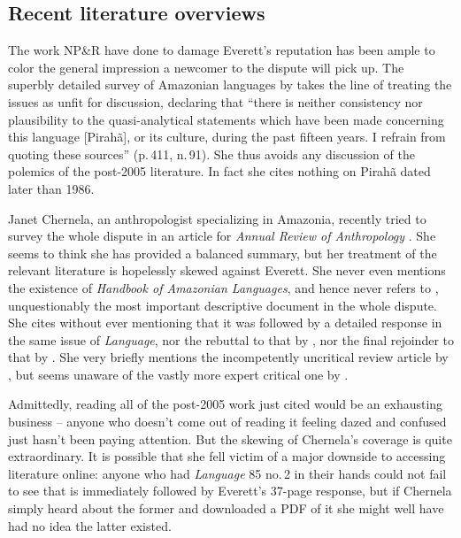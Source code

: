 \documentclass[output=paper,colorlinks,citecolor=brown
]{langscibook}
\begin{document}
\subsection{Recent literature overviews}

The work NP\&R have done to damage Everett's reputation has been ample
to color the general impression a newcomer to the dispute will pick up.
The superbly detailed survey of Amazonian languages by \citet{Aikhenvald12}
takes the line of treating the issues as unfit for discussion, declaring
that ``there is neither consistency nor plausibility to the quasi-analytical
statements which have been made concerning this language [Pirah{\~a}], or
its culture, during the past fifteen years. I refrain from quoting these
sources'' (p.\,411, n.\,91). She thus avoids any discussion of the
polemics of the post-2005 literature. In fact she cites nothing on
Pirah{\~a} dated later than 1986.

Janet Chernela, an anthropologist specializing in Amazonia, recently
tried to survey the whole dispute in an article for \textit{Annual
Review of Anthropology} \citep{Chernela23}. She seems to think she
has provided a balanced summary, but her treatment of the relevant
literature is hopelessly skewed against Everett. She never even
mentions the existence of \textit{Handbook of Amazonian Languages},
and hence never refers to \citet{Everett86HAL}, unquestionably the
most important descriptive document in the whole dispute. She cites
\citet{NevPesRod09a} without ever mentioning that it was followed by
a detailed response \citep{Everett09} in the same issue of
\textit{Language}, nor the rebuttal to that by \citet{NevPesRod09b},
nor the final rejoinder to that by \citet{Everett13}. She very
briefly mentions the incompetently uncritical review article by
\citet{Hornstein19}, but seems unaware of the vastly more expert
critical one by \citet{EverGibs19}.

Admittedly, reading all of the post-2005 work just cited would be
an exhausting business -- anyone who doesn't come out of reading it
feeling dazed and confused just hasn't been paying attention. But
the skewing of Chernela's coverage is quite extraordinary. It is
possible that she fell victim of a major downside to accessing
literature online: anyone who had \textit{Language} 85 no.\,2
in their hands could not fail to see that \citet{NevPesRod09a}
is immediately followed by Everett's 37-page response, but if
Chernela simply heard about the former and downloaded a PDF of it
she might well have had no idea the latter existed.
\end{document}

